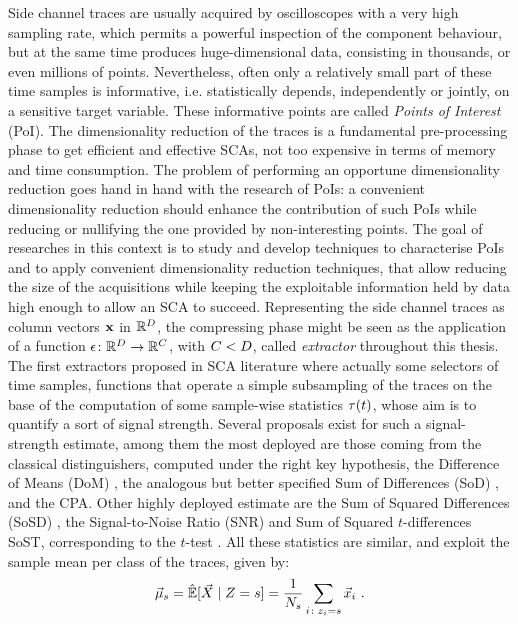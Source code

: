 Side channel traces are usually acquired by oscilloscopes with a very high sampling rate, which permits a powerful inspection of the component behaviour, but at the same time produces huge-dimensional data, consisting in thousands, or even millions of points. Nevertheless, often only a relatively small part of these time samples is informative, i.e. statistically depends, independently or jointly, on a sensitive target variable. These informative points are called \emph{Points of Interest} (PoI). The dimensionality reduction of the traces is a fundamental pre-processing phase to get efficient and effective SCAs, not too expensive in terms of memory and time consumption. The problem of performing an opportune dimensionality reduction goes hand in hand with the research of PoIs: a convenient dimensionality reduction should enhance the contribution of such PoIs while reducing or nullifying the one provided by non-interesting points. 
The goal of researches in this context is to study and develop techniques to characterise PoIs and to apply convenient dimensionality reduction techniques, that allow reducing the size of the acquisitions while keeping the exploitable information held by data high enough to allow an SCA to succeed.
Representing the side channel traces as column vectors ${\bf x}$ in $\mathbb{R}^D$, the compressing phase might be seen as the application of a function $\epsilon\colon \mathbb{R}^D\rightarrow \mathbb{R}^C$, with $C<D$, called {\em extractor} throughout this thesis. The first extractors proposed in SCA literature where actually some selectors of time samples, \ie functions that operate a simple subsampling of the traces on the base of the computation of some sample-wise statistics $\tau(t)$, whose aim is to quantify a sort of  signal strength. Several proposals exist for such a signal-strength estimate, among them the most deployed are those coming from the classical distinguishers, computed under the right key hypothesis, \eg the Difference of Means (DoM) \cite{Chari2003}, the analogous but better specified Sum of Differences (SoD) \cite{Rechberger2005}, and the CPA. Other highly deployed estimate are the Sum of Squared Differences (SoSD) \cite{gierlichs2006templates}, the Signal-to-Noise Ratio (SNR) \cite{mangard2008power,lomne2013behind} and  Sum of Squared $t$-differences SoST, corresponding to the $t$-test \cite{gierlichs2006templates}. All these statistics are similar, and exploit the sample mean per class of the traces, given by:
\begin{equation}\label{eq:mmmXclass}
\mmmXclass= \esperEst[\given{\vaLeakVec}{\sensRandVar = \sensVarGenValue}] = \frac{1}{\nbTracesPerClass}\sum_{i\colon \sensVar_i=\sensVarGenValue} \vLeakVec_i  \mbox{ .}
\end{equation} 
